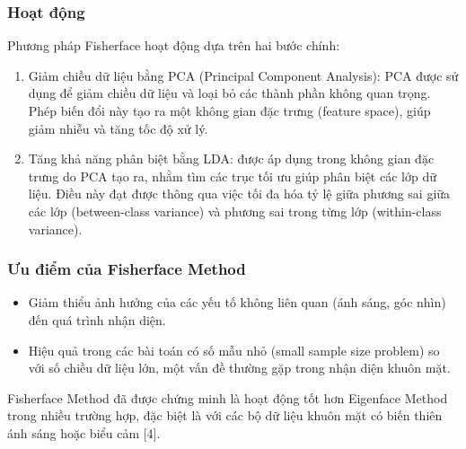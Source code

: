 \documentclass[a4paper,12pt]{extarticle}
\begin{document}
\subsubsection{Hoạt động}
Phương pháp Fisherface hoạt động dựa trên hai bước chính: \\
\begin{enumerate}
     \item Giảm chiều dữ liệu bằng PCA (Principal Component Analysis): PCA được sử dụng để giảm chiều dữ liệu và loại bỏ các thành phần không quan trọng. Phép biến đổi này tạo ra một không gian đặc trưng (feature space), giúp giảm nhiễu và tăng tốc độ xử lý.
     \item Tăng khả năng phân biệt bằng LDA: được áp dụng trong không gian đặc trưng do PCA tạo ra, nhằm tìm các trục tối ưu giúp phân biệt các lớp dữ liệu. Điều này đạt được thông qua việc tối đa hóa tỷ lệ giữa phương sai giữa các lớp (between-class variance) và phương sai trong từng lớp (within-class variance).
\end{enumerate}
\subsubsection{Ưu điểm của Fisherface Method}
\begin{itemize}
    \item Giảm thiểu ảnh hưởng của các yếu tố không liên quan (ánh sáng, góc nhìn) đến quá trình nhận diện.
    \item Hiệu quả trong các bài toán có số mẫu nhỏ (small sample size problem) so với số chiều dữ liệu lớn, một vấn đề thường gặp trong nhận diện khuôn mặt.
\end{itemize}
Fisherface Method đã được chứng minh là hoạt động tốt hơn Eigenface Method trong nhiều trường hợp, đặc biệt là với các bộ dữ liệu khuôn mặt có biến thiên ánh sáng hoặc biểu cảm [4].
\end{document}

